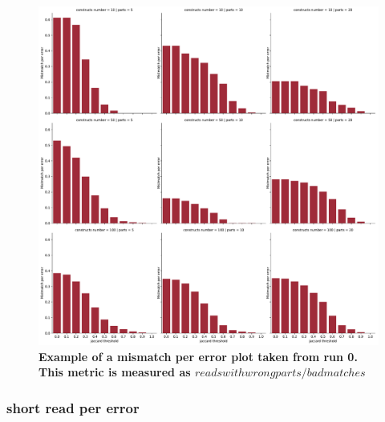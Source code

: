 \documentclass[11pt, a4paper]{article}
\begin{document}
\begin{figure}[ht]
    \begin{center}
    \includegraphics[width=1\textwidth]{../results/images_notebook/v_310/001_mismatch_per_error.pdf}
    \end{center}
    \caption{{\bf Example of a mismatch per error plot taken from run 0. This metric is measured as $reads with wrong parts/bad matches$ }}
   \label{fig:v_310_mismatch_per_error}
\end{figure}


\subsubsection{short read per error }
\end{document}
